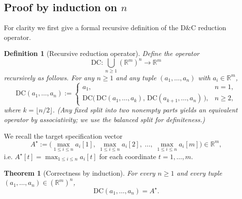 \documentclass[11pt]{article}
\newtheorem{theorem}{Theorem}
\newtheorem{definition}{Definition}
\begin{document}
\subsection{Proof by induction on \(n\)}

For clarity we first give a formal recursive definition of the D\&C reduction operator.

\begin{definition}[Recursive reduction operator]
Define the operator
\[
\mathrm{DC}:\bigcup_{n\ge 1} (\mathbb{R}^m)^n \longrightarrow \mathbb{R}^m
\]
recursively as follows. For any \(n\ge 1\) and any tuple \((a_1,\dots,a_n)\) with \(a_i\in\mathbb{R}^m\),
\[
\mathrm{DC}(a_1,\dots,a_n) :=
\begin{cases}
a_1, & n=1,\\[4pt]
\mathrm{DC}\big( \,\mathrm{DC}(a_1,\dots,a_{k}),\,\mathrm{DC}(a_{k+1},\dots,a_n)\,\big),
& n\ge 2,
\end{cases}
\]
where \(k=\lfloor n/2\rfloor\). (Any fixed split into two nonempty parts yields an equivalent operator by associativity; we use the balanced split for definiteness.)
\end{definition}

We recall the target specification vector
\[
A^\star := \big( \max_{1\le i\le n} a_i[1],\; \max_{1\le i\le n} a_i[2],\; \dots,\; \max_{1\le i\le n} a_i[m] \big)
\in\mathbb{R}^m,
\]
i.e. \(A^\star[t]=\max_{1\le i\le n} a_i[t]\) for each coordinate \(t=1,\dots,m\).

\begin{theorem}[Correctness by induction]
For every \(n\ge 1\) and every tuple \((a_1,\dots,a_n)\in(\mathbb{R}^m)^n\),
\[
\mathrm{DC}(a_1,\dots,a_n)=A^\star.
\]
\end{theorem}
\end{document}
